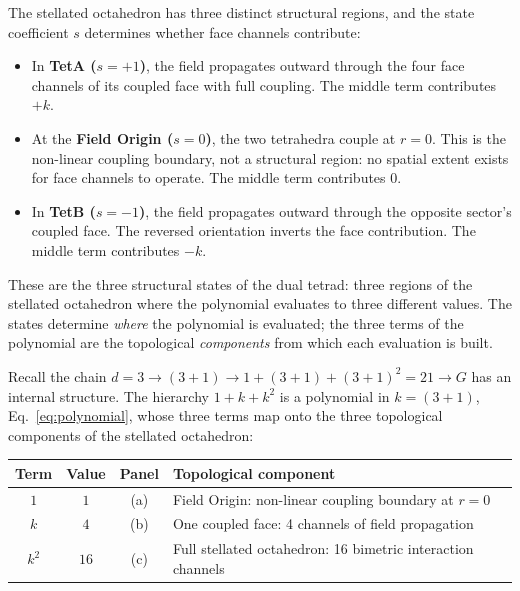 \documentclass[aps,prd,preprint,superscriptaddress,showpacs,preprintnumbers,amsmath,amssymb,nofootinbib]{revtex4-2}
\begin{document}
The stellated octahedron has three distinct structural regions, and the state coefficient $s$ determines whether face channels contribute:

\begin{itemize}
\item In \textbf{TetA ($s = +1$)}, the field propagates outward through the four face channels of its coupled face with full coupling. The middle term contributes $+k$.
\item At the \textbf{Field Origin ($s = 0$)}, the two tetrahedra couple at $r = 0$. This is the non-linear coupling boundary, not a structural region: no spatial extent exists for face channels to operate. The middle term contributes $0$.
\item In \textbf{TetB ($s = -1$)}, the field propagates outward through the opposite sector's coupled face. The reversed orientation inverts the face contribution. The middle term contributes $-k$.
\end{itemize}

These are the three structural states of the dual tetrad: three regions of the stellated octahedron where the polynomial evaluates to three different values. The states determine \emph{where} the polynomial is evaluated; the three terms of the polynomial are the topological \emph{components} from which each evaluation is built.

Recall the chain $d = 3 \to (3{+}1) \to 1 + (3{+}1) + (3{+}1)^2 = 21 \to G$ has an internal structure. The hierarchy $1 + k + k^2$ is a polynomial in $k = (3{+}1)$, Eq.~\eqref{eq:polynomial}, whose three terms map onto the three topological components of the stellated octahedron:

\begin{center}
\renewcommand{\arraystretch}{1.4}
\begin{tabular*}{\textwidth}{@{\extracolsep{\fill}} cccl}
\hline
\textbf{Term} & \textbf{Value} & \textbf{Panel} & \textbf{Topological component} \\
\hline
$1$ & $1$ & (a) & Field Origin: non-linear coupling boundary at $r = 0$ \\
$k$ & $4$ & (b) & One coupled face: 4 channels of field propagation \\
$k^2$ & $16$ & (c) & Full stellated octahedron: 16 bimetric interaction channels \\
\hline
\end{tabular*}
\end{center}
\end{document}
